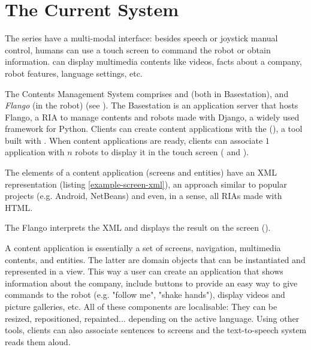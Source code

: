 \section{The Current System}
The  series have a multi-modal interface: besides speech or joystick manual control, humans can use a touch screen to command the robot or obtain information.
 can display multimedia contents like videos, facts about a company, robot features, language settings, etc.

The Contents Management System comprises \emph{\flangofe} and \emph{\flangobe} (both in Basestation), and \emph{Flango \cm} (in the robot) (see ).
The Basestation is an application server that hosts Flango, a \ac{RIA} to manage contents and robots made with Django, a widely used framework for Python. 
Clients can create content applications  with the \flangofe (\se), a tool built with \flash .
When content applications are ready, clients can associate $1$ application with $n$ robots to display it in the touch screen ( and ).



The elements of a content application (screens and entities) have an \ac{XML} representation (listing \ref{example-screen-xml}), an approach similar to popular projects (e.g. Android, NetBeans) and even, in a sense, all \acp{RIA} made with \ac{HTML}.

The Flango \cm interprets the \ac{XML} and displays the result on the screen ().

A content application is essentially a set of screens, navigation, multimedia contents, and entities. 
The latter are domain objects that can be instantiated and represented in a view. 
This way a user can create an application that shows information about the company, include buttons to provide an easy way to give commands to the robot (e.g. "follow me", "shake hands"), display videos and picture galleries, etc.
All of these components are localisable:  
They can be resized, repositioned, repainted... depending on the active language.
Using other tools, clients can also associate sentences to screens and the text-to-speech system reads them aloud.

